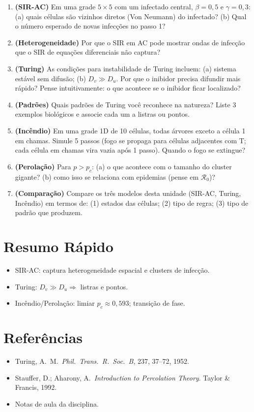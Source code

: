 \documentclass[12pt,a4paper]{article}
\begin{document}
\begin{enumerate}
  \item \textbf{(SIR-AC)} Em uma grade $5\times5$ com um infectado central, $\beta=0{,}5$ e $\gamma=0{,}3$: (a) quais c\'elulas s\~ao vizinhos diretos (Von Neumann) do infectado? (b) Qual o n\'umero esperado de novas infec\c{c}\~oes no passo 1?
  
  \item \textbf{(Heterogeneidade)} Por que o SIR em AC pode mostrar ondas de infec\c{c}\~ao que o SIR de equa\c{c}\~oes diferenciais n\~ao captura?
  
  \item \textbf{(Turing)} As condi\c{c}\~oes para instabilidade de Turing incluem: (a) sistema est\'avel sem difus\~ao; (b) $D_v \gg D_u$. Por que o inibidor precisa difundir mais r\'apido? Pense intuitivamente: o que acontece se o inibidor ficar localizado?
  
  \item \textbf{(Padr\~oes)} Quais padr\~oes de Turing voc\^e reconhece na natureza? Liste 3 exemplos biol\'ogicos e associe cada um a listras ou pontos.
  
  \item \textbf{(Inc\^endio)} Em uma grade 1D de 10 c\'elulas, todas \'arvores exceto a c\'elula 1 em chamas. Simule 5 passos (fogo se propaga para c\'elulas adjacentes com T; cada c\'elula em chamas vira vazia ap\'os 1 passo). Quando o fogo se extingue?
  
  \item \textbf{(Perola\c{c}\~ao)} Para $p > p_c$: (a) o que acontece com o tamanho do cluster gigante? (b) como isso se relaciona com epidemias (pense em $\mathcal{R}_0$)?
  
  \item \textbf{(Compara\c{c}\~ao)} Compare os tr\^es modelos desta unidade (SIR-AC, Turing, Inc\^endio) em termos de: (1) estados das c\'elulas; (2) tipo de regra; (3) tipo de padr\~ao que produzem.
\end{enumerate}

\section*{Resumo R\'apido}
\begin{itemize}
  \item SIR-AC: captura heterogeneidade espacial e clusters de infec\c{c}\~ao.
  \item Turing: $D_v \gg D_u \Rightarrow$ listras e pontos.
  \item Inc\^endio/Perola\c{c}\~ao: limiar $p_c\approx0{,}593$; transi\c{c}\~ao de fase.
\end{itemize}

\section*{Refer\^encias}
\begin{itemize}
  \item Turing, A.\ M.\ \textit{Phil.\ Trans.\ R.\ Soc.\ B}, 237, 37--72, 1952.
  \item Stauffer, D.; Aharony, A.\ \textit{Introduction to Percolation Theory}. Taylor \& Francis, 1992.
  \item Notas de aula da disciplina.
\end{itemize}
\end{document}

